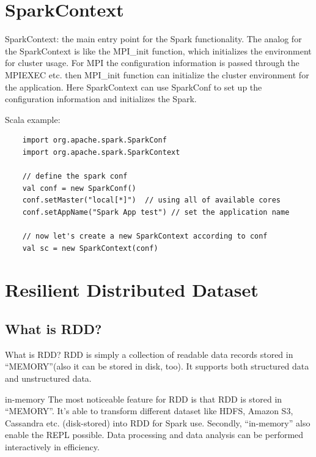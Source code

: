 \documentclass[notheorems, aspectratio=54]{beamer}
\begin{document}
\section{SparkContext}
\begin{frame}[fragile]
  

   \begin{block}{SparkContext: the main entry point for the Spark functionality.}
   The analog for the SparkContext  is like the MPI\_init function, which initializes the environment for cluster usage. 
   For MPI the configuration information is passed through the MPIEXEC etc. then 
   MPI\_init function can initialize the cluster environment for the application.
   Here SparkContext can use SparkConf
   to set up the configuration information and initializes the Spark.
   \end{block}
   
   Scala example:
   \begin{verbatim}
    import org.apache.spark.SparkConf
    import org.apache.spark.SparkContext

    // define the spark conf
    val conf = new SparkConf()
    conf.setMaster("local[*]")  // using all of available cores 
    conf.setAppName("Spark App test") // set the application name

    // now let's create a new SparkContext according to conf
    val sc = new SparkContext(conf)
   \end{verbatim}     
  
\end{frame}


\section{Resilient Distributed Dataset}
\subsection{What is RDD?}
\begin{frame}

 \begin{block}{What is RDD?}
  RDD is simply a collection of readable data records stored in ``MEMORY''(also it can be stored in disk, too). 
  It supports both structured data and unstructured data. 
 \end{block}
 
 \begin{block}{in-memory}
   The most noticeable feature for RDD is that RDD is stored in ``MEMORY''. 
 It's able to transform different dataset like HDFS, Amazon S3, Cassandra etc. 
 (disk-stored) into RDD for Spark use. Secondly, ``in-memory'' also enable the 
 REPL possible. Data processing and data analysis can be performed interactively
 in efficiency. 
 \end{block}

\end{frame}
\end{document}
